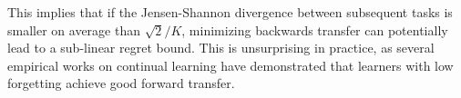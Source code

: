 \documentclass[letterpaper]{article}
\theoremstyle{definition}
\begin{document}
This implies that if the Jensen-Shannon divergence between subsequent tasks is smaller on average than $\sqrt{2}/K$, minimizing backwards transfer can potentially lead to a sub-linear regret bound. This is unsurprising in practice, as several empirical works on continual learning have demonstrated that learners with low forgetting achieve good forward transfer.

\clearpage


\end{document}
